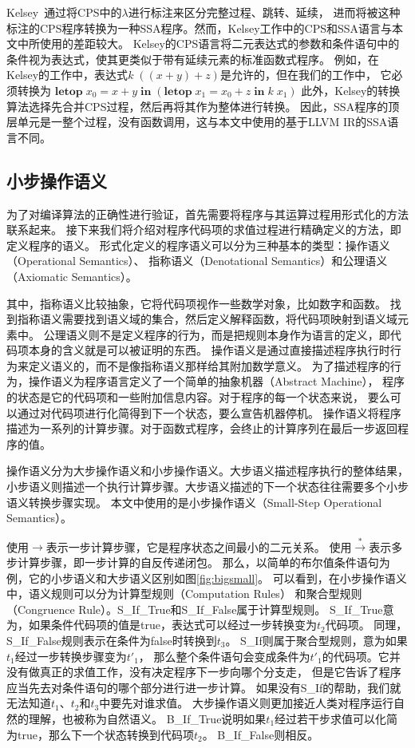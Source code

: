 Kelsey~\cite{kelsey1995correspondence}通过将CPS中的$\lambda$进行标注来区分完整过程、跳转、延续，
进而将被这种标注的CPS程序转换为一种SSA程序。然而，Kelsey工作中的CPS和SSA语言与本文中所使用的差距较大。
Kelsey的CPS语言将二元表达式的参数和条件语句中的条件视为表达式，使其更类似于带有延续元素的标准函数式程序。
例如，在Kelsey的工作中，表达式$k\; ((x+y)+z)$是允许的，但在我们的工作中，
它必须转换为
$\mathbf{letop}\; x_0 = x+y\; \mathbf{in}\; (\mathbf{letop}\; x_1 = x_0+z\; \mathbf{in}\; k\; x_1)$
此外，Kelsey的转换算法选择先合并CPS过程，然后再将其作为整体进行转换。
因此，SSA程序的顶层单元是一整个过程，没有函数调用，这与本文中使用的基于LLVM IR的SSA语言不同。

\subsection{小步操作语义} 

为了对编译算法的正确性进行验证，首先需要将程序与其运算过程用形式化的方法联系起来。
接下来我们将介绍对程序代码项的求值过程进行精确定义的方法，即定义程序的语义。
形式化定义的程序语义可以分为三种基本的类型：操作语义（Operational Semantics）、
指称语义（Denotational Semantics）和公理语义（Axiomatic Semantics）\cite{pierce2002types}。

其中，指称语义比较抽象，它将代码项视作一些数学对象，比如数字和函数。
找到指称语义需要找到语义域的集合，然后定义解释函数，将代码项映射到语义域元素中。
公理语义则不是定义程序的行为，而是把规则本身作为语言的定义，即代码项本身的含义就是可以被证明的东西。
操作语义是通过直接描述程序执行时行为来定义语义的，而不是像指称语义那样给其附加数学意义。
为了描述程序的行为，操作语义为程序语言定义了一个简单的抽象机器（Abstract Machine），
程序的状态是它的代码项和一些附加信息内容。对于程序的每一个状态来说，
要么可以通过对代码项进行化简得到下一个状态，要么宣告机器停机。
操作语义将程序描述为一系列的计算步骤。对于函数式程序，会终止的计算序列在最后一步返回程序的值。

操作语义分为大步操作语义和小步操作语义。大步语义描述程序执行的整体结果，
小步语义则描述一个执行计算步骤。大步语义描述的下一个状态往往需要多个小步语义转换步骤实现。
本文中使用的是小步操作语义（Small-Step Operational Semantics）。

使用$\rightarrow $表示一步计算步骤，它是程序状态之间最小的二元关系。
使用$\xrightarrow{*} $表示多步计算步骤，即一步计算的自反传递闭包。
那么，以简单的布尔值条件语句为例，它的小步语义和大步语义区别如图\ref{fig:bigsmall}。
可以看到，在小步操作语义中，语义规则可以分为计算型规则（Computation Rules）
和聚合型规则（Congruence Rule）。S\_If\_True和S\_If\_False属于计算型规则。
S\_If\_True意为，如果条件代码项的值是true，表达式可以经过一步转换变为$t_2$代码项。
同理，S\_If\_False规则表示在条件为false时转换到$t_3$。
S\_If则属于聚合型规则，意为如果$t_1$经过一步转换步骤变为$t'_1$，
那么整个条件语句会变成条件为$t'_1$的代码项。它并没有做真正的求值工作，没有决定程序下一步向哪个分支走，
但是它告诉了程序应当先去对条件语句的哪个部分进行进一步计算。
如果没有S\_If的帮助，我们就无法知道$t_1$、$t_2$和$t_3$中要先对谁求值。
大步操作语义则更加接近人类对程序运行自然的理解，也被称为自然语义。
B\_If\_True说明如果$t_1$经过若干步求值可以化简为true，那么下一个状态转换到代码项$t_2$。
B\_If\_False则相反。

